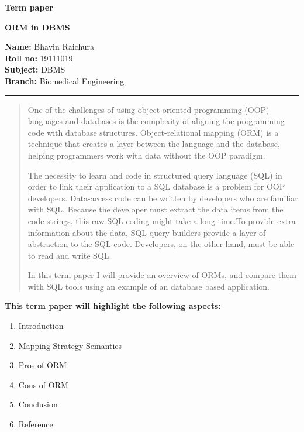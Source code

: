 \documentclass[10pt,a4paper,twoside]{article}
\begin{document}
\begin{center}
\vspace{.3cm}
{\bf {\huge Term paper}}
\item
{\bf {\huge ORM in DBMS}}
\vspace{.3cm}
\end{center}
{\bf Name:} Bhavin Raichura\\
{\bf Roll no:} 19111019 \\
{\bf Subject:} DBMS\\
{\bf Branch:} Biomedical Engineering \hspace{\fill}   \\
\hrule

\vspace{.5cm}
\vspace{.4cm}

\renewcommand{\abstractname}{Abstract}

\begin{abstract}
\item One of the challenges of using object-oriented programming (OOP) languages and databases is the complexity of aligning the programming code with database structures. Object-relational mapping (ORM) is a technique that creates a layer between the language and the database, helping programmers work with data without the OOP paradigm.
\item The necessity to learn and code in structured query language (SQL) in order to link their application to a SQL database is a problem for OOP developers.
Data-access code can be written by developers who are familiar with SQL.
Because the developer must extract the data items from the code strings, this raw SQL coding might take a long time.To provide extra information about the data, SQL query builders provide a layer of abstraction to the SQL code. Developers, on the other hand, must be able to read and write SQL.
\item In this term paper I will provide an overview of ORMs, and compare them with SQL tools using an example of an database based application.
\end{abstract}

\item
\item
{\bf {\Large This term paper will highlight the following aspects: }}\\
\begin{itemize}
\end{itemize}
\item 
\begin{enumerate}
\item Introduction
\item Mapping Strategy Semantics
\item Pros of ORM
\item Cons of ORM
\item Conclusion
\item Reference 
\end{enumerate}
\end{document}
